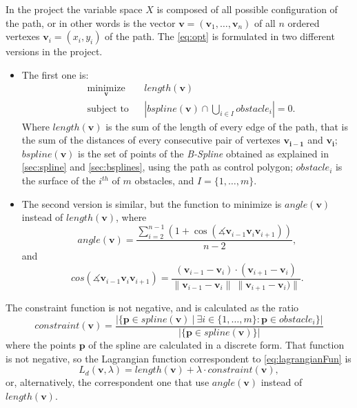\documentclass[dissertation.tex]{subfiles}
\begin{document}
In the project the variable space $X$ is composed of all possible
configuration of the path, or in other words is the vector
$\mathbf{v}=(\mathbf{v}_1,\dots,\mathbf{v}_n)$ of all $n$ ordered
vertexes $\mathbf{v}_i=(x_i,y_i)$ of the
path. The \cref{eq:opt} is formulated in two different
versions in the project.
\begin{itemize}
\item The first one is:
  \begin{equation*}
    \begin{aligned}
      & \underset{\mathbf{v}}{\text{minimize}}
      & & length(\mathbf{v}) \\
      & \text{subject to}
      & & \left|bspline(\mathbf{v})\cap \bigcup_{i\in I}obstacle_i\right| = 0.
    \end{aligned}
  \end{equation*}
  Where $length(\mathbf{v})$ is the sum of the length of every edge of the
  path, that is the sum of the distances of every consecutive pair of
  vertexes $\mathbf{v_{i-1}}$ and $\mathbf{v_i}$; $bspline(\mathbf{v})$
  is the set of points of the \emph{B-Spline} obtained as explained in
  \cref{sec:spline} and \cref{sec:bsplines}, using the path as
  control polygon;
  $obstacle_i$ is the surface of the $i^{th}$ of $m$ obstacles, and
  $I=\{1,\dots,m\}$.
\item The second version is similar, but the function to minimize is
  $angle(\mathbf{v})$ instead of $length(\mathbf{v})$, where
  \begin{equation*}
    angle(\mathbf{v}) = \frac{\sum_{i=2}^{n-1}(1+\cos(\measuredangle \mathbf{v}_{i-1}\mathbf{v}_{i}\mathbf{v}_{i+1}))}{n-2},
  \end{equation*}
  and
  \begin{equation*}
    cos(\measuredangle
    \mathbf{v}_{i-1}\mathbf{v}_{i}\mathbf{v}_{i+1})=\frac{(\mathbf{v}_{i-1}-\mathbf{v}_{i})\cdot
      (\mathbf{v}_{i+1}-\mathbf{v}_{i})}{\|\mathbf{v}_{i-1}-\mathbf{v}_{i}\|\
      \|\mathbf{v}_{i+1}-\mathbf{v}_{i})\|}.
  \end{equation*}
\end{itemize}

The constraint function is not negative, and is calculated as the
ratio
\begin{equation*}
constraint(\mathbf{v}) = \frac{|\{\mathbf{p} \in spline(\mathbf{v})\ |\ \exists i\in\{1,\dots,m\}
  : \mathbf{p}\in obstacle_i \}|}{|\{\mathbf{p} \in spline(\mathbf{v})\}|}
\end{equation*}
where the points $\mathbf{p}$ of the spline are calculated in a discrete form. That
function is not negative, so the Lagrangian function correspondent to
\cref{eq:lagrangianFun} is
\begin{equation}\label{eq:lagrangianFunProj}
    L_d(\mathbf{v},\lambda)=length(\mathbf{v})+\lambda\cdot constraint(\mathbf{v}),
\end{equation}
or, alternatively, the correspondent one that use $angle(\mathbf{v})$ instead of $length(\mathbf{v})$.
\end{document}
